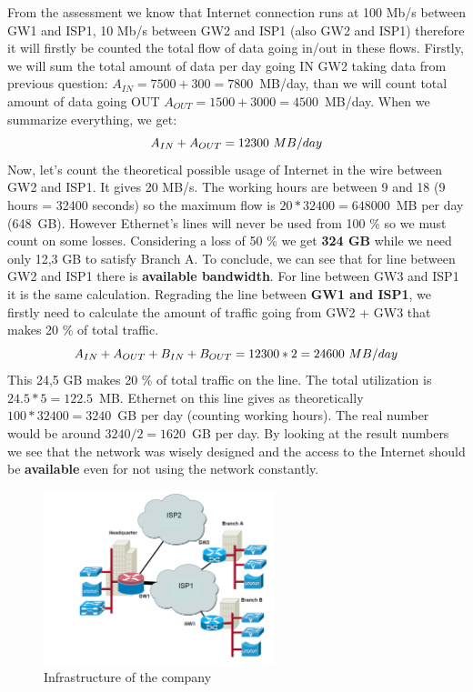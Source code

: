 \documentclass[11pt,a4paper]{article}
\begin{document}
\begin{enumerate}
From the assessment we know that Internet connection runs at 100 Mb/s between GW1 and ISP1, 10 Mb/s between GW2 and ISP1 (also GW2 and ISP1) therefore it will firstly be counted the total flow of data going in/out in these flows. 
Firstly, we will sum the total amount of data per day going IN GW2 taking data from previous question: $A_{IN} = 7500 + 300 = 7800$~MB/day, than we will count total amount of data going OUT $A_{OUT} = 1500 + 3000 = 4500$~MB/day. When we summarize everything, we get:
\begin{equation} 
A_{IN} + A_{OUT} = 12300~MB/day\notag
\end{equation}
Now, let's count the theoretical possible usage of Internet in the wire between GW2 and ISP1. It gives 20 MB/s. The working hours are between 9 and 18 (9 hours = 32400 seconds) so the maximum flow is $20 * 32400 = 648000$~MB per day (648~GB). However Ethernet's lines will never be used from 100 \% so we must count on some losses. Considering a loss of 50 \% we get \textbf{324 GB} while we need only 12,3 GB to satisfy Branch A. To conclude, we can see that for line between GW2 and ISP1 there is \textbf{available bandwidth}. For line between GW3 and ISP1 it is the same calculation.
Regrading the line between \textbf{GW1 and ISP1}, we firstly need to calculate the amount of traffic going from GW2 + GW3 that makes 20 \% of total traffic.
\begin{equation} 
A_{IN} + A_{OUT} + B_{IN} + B_{OUT} = 12300 * 2 = 24600~MB/day\notag
\end{equation}
This 24,5 GB makes 20 \% of total traffic on the line. The total utilization is $24.5 * 5 = 122.5$~MB. Ethernet on this line gives as theoretically $100 * 32 400 = 3 240$~GB per day (counting working hours). The real number would be around $3 240 / 2 = 1620$~GB per day. By looking at the result numbers we see that the network was wisely designed and the access to the Internet should be \textbf{available} even for not using the network constantly.
\end{enumerate}{}


\begin{figure}[h]
\centering
\includegraphics[width=0.6\textwidth]{Capture.PNG}
\caption{Infrastructure of the company}
\label{fig:protokol}
\end{figure}
\end{document}
